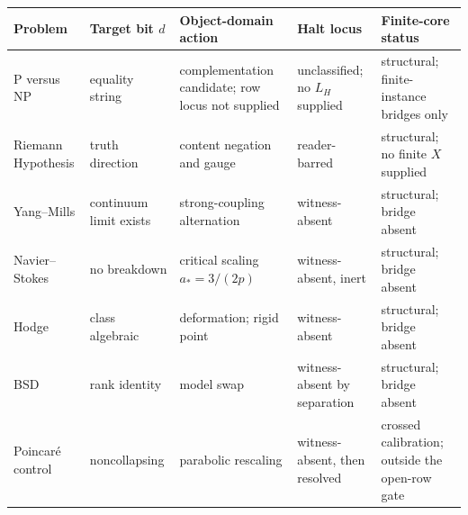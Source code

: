 \documentclass[10pt,twocolumn]{article}
\begin{document}
\begin{table}[!tbp]
\smaller
\centering
\begin{tabular}{@{}
  >{\raggedright\arraybackslash}p{}
  >{\raggedright\arraybackslash}p{}
  >{\raggedright\arraybackslash}p{}
  >{\raggedright\arraybackslash}p{}
  >{\raggedright\arraybackslash}p{}@{}}

\toprule\noalign{}
\begin{minipage}[b]{\linewidth}\raggedright
Problem
\end{minipage} & \begin{minipage}[b]{\linewidth}\raggedright
Target bit \(d\)
\end{minipage} & \begin{minipage}[b]{\linewidth}\raggedright
Object-domain action
\end{minipage} & \begin{minipage}[b]{\linewidth}\raggedright
Halt locus
\end{minipage} & \begin{minipage}[b]{\linewidth}\raggedright
Finite-core status
\end{minipage} \\
\midrule\noalign{}
\bottomrule\noalign{}
P versus NP & equality string & complementation candidate; row locus not
supplied & unclassified; no \(L_H\) supplied & structural;
finite-instance bridges only \\
Riemann Hypothesis & truth direction & content negation and gauge &
reader-barred & structural; no finite \(X\) supplied \\
Yang--Mills & continuum limit exists & strong-coupling alternation &
witness-absent & structural; bridge absent \\
Navier--Stokes & no breakdown & critical scaling \(a_* = 3/(2p)\) &
witness-absent, inert & structural; bridge absent \\
Hodge & class algebraic & deformation; rigid point & witness-absent &
structural; bridge absent \\
BSD & rank identity & model swap & witness-absent by separation &
structural; bridge absent \\
Poincaré control & noncollapsing & parabolic rescaling & witness-absent,
then resolved & crossed calibration; outside the open-row gate \\
\bottomrule
\end{tabular}
\end{table}
\end{document}
